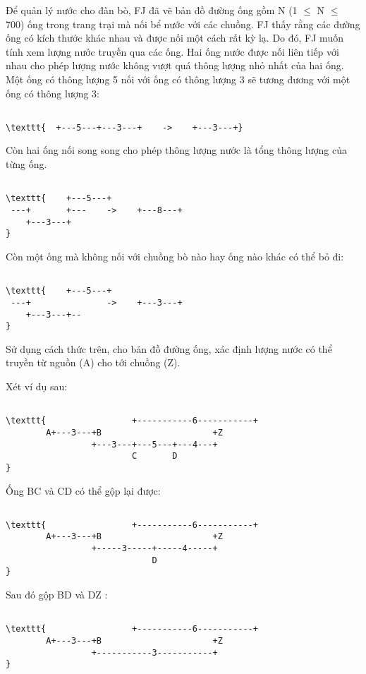 

Để quản lý nước cho đàn bò, FJ đã vẽ bản đồ đường ống gồm N (1  $\le$  N  $\le$  700) ống trong trang trại mà nối bể nước với các chuồng. FJ thấy rằng các đường ống có kích thước khác nhau và được nối một cách rất kỳ lạ. Do đó, FJ muốn tính xem lượng nước truyền qua các ống. Hai ống nước được nối liên tiếp với nhau cho phép lượng nước không vượt quá thông lượng nhỏ nhất của hai ống. Một ống có thông lượng 5 nối với ống có thông lượng 3 sẽ tương đương với một ống có thông lượng 3:
\begin{verbatim}

\texttt{  +---5---+---3---+    ->    +---3---+}\end{verbatim}

Còn hai ống nối song song cho phép thông lượng nước là tổng thông lượng của từng ống.
\begin{verbatim}

\texttt{    +---5---+
 ---+       +---    ->    +---8---+
    +---3---+
}\end{verbatim}

Còn một ống mà không nối với chuồng bò nào hay ống nào khác có thể bỏ đi:
\begin{verbatim}

\texttt{    +---5---+
 ---+               ->    +---3---+
    +---3---+--
}\end{verbatim}

Sử dụng cách thức trên, cho bản đồ đường ống, xác định lượng nước có thể truyền từ nguồn (A) cho tới chuồng (Z).

Xét ví dụ sau:
\begin{verbatim}

\texttt{                 +-----------6-----------+
        A+---3---+B                      +Z
                 +---3---+---5---+---4---+
                         C       D
}\end{verbatim}

Ống BC và CD có thể gộp lại được:
\begin{verbatim}

\texttt{                 +-----------6-----------+
        A+---3---+B                      +Z
                 +-----3-----+-----4-----+
                             D
}\end{verbatim}

Sau đó gộp BD và DZ :
\begin{verbatim}

\texttt{                 +-----------6-----------+
        A+---3---+B                      +Z
                 +-----------3-----------+
}\end{verbatim}

